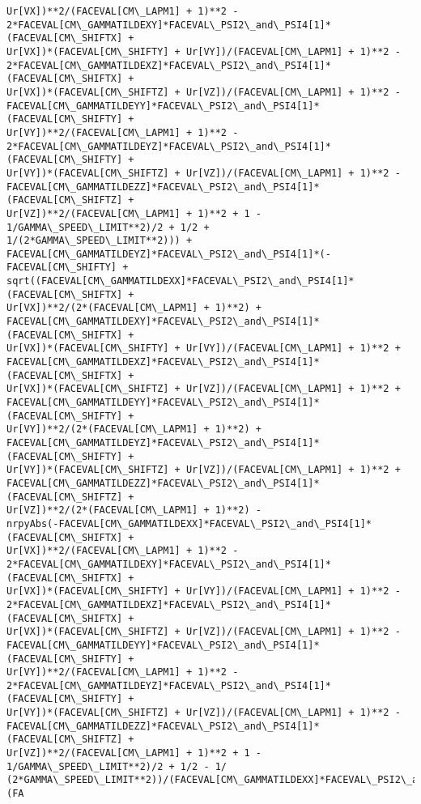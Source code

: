 \documentclass[landscape,letterpaper,10pt,english]{article}
\begin{document}
\begin{Verbatim}[commandchars=\\\{\}]
Ur[VX])**2/(FACEVAL[CM\_LAPM1] + 1)**2 -
2*FACEVAL[CM\_GAMMATILDEXY]*FACEVAL\_PSI2\_and\_PSI4[1]*(FACEVAL[CM\_SHIFTX] +
Ur[VX])*(FACEVAL[CM\_SHIFTY] + Ur[VY])/(FACEVAL[CM\_LAPM1] + 1)**2 -
2*FACEVAL[CM\_GAMMATILDEXZ]*FACEVAL\_PSI2\_and\_PSI4[1]*(FACEVAL[CM\_SHIFTX] +
Ur[VX])*(FACEVAL[CM\_SHIFTZ] + Ur[VZ])/(FACEVAL[CM\_LAPM1] + 1)**2 -
FACEVAL[CM\_GAMMATILDEYY]*FACEVAL\_PSI2\_and\_PSI4[1]*(FACEVAL[CM\_SHIFTY] +
Ur[VY])**2/(FACEVAL[CM\_LAPM1] + 1)**2 -
2*FACEVAL[CM\_GAMMATILDEYZ]*FACEVAL\_PSI2\_and\_PSI4[1]*(FACEVAL[CM\_SHIFTY] +
Ur[VY])*(FACEVAL[CM\_SHIFTZ] + Ur[VZ])/(FACEVAL[CM\_LAPM1] + 1)**2 -
FACEVAL[CM\_GAMMATILDEZZ]*FACEVAL\_PSI2\_and\_PSI4[1]*(FACEVAL[CM\_SHIFTZ] +
Ur[VZ])**2/(FACEVAL[CM\_LAPM1] + 1)**2 + 1 - 1/GAMMA\_SPEED\_LIMIT**2)/2 + 1/2 +
1/(2*GAMMA\_SPEED\_LIMIT**2))) +
FACEVAL[CM\_GAMMATILDEYZ]*FACEVAL\_PSI2\_and\_PSI4[1]*(-FACEVAL[CM\_SHIFTY] +
sqrt((FACEVAL[CM\_GAMMATILDEXX]*FACEVAL\_PSI2\_and\_PSI4[1]*(FACEVAL[CM\_SHIFTX] +
Ur[VX])**2/(2*(FACEVAL[CM\_LAPM1] + 1)**2) +
FACEVAL[CM\_GAMMATILDEXY]*FACEVAL\_PSI2\_and\_PSI4[1]*(FACEVAL[CM\_SHIFTX] +
Ur[VX])*(FACEVAL[CM\_SHIFTY] + Ur[VY])/(FACEVAL[CM\_LAPM1] + 1)**2 +
FACEVAL[CM\_GAMMATILDEXZ]*FACEVAL\_PSI2\_and\_PSI4[1]*(FACEVAL[CM\_SHIFTX] +
Ur[VX])*(FACEVAL[CM\_SHIFTZ] + Ur[VZ])/(FACEVAL[CM\_LAPM1] + 1)**2 +
FACEVAL[CM\_GAMMATILDEYY]*FACEVAL\_PSI2\_and\_PSI4[1]*(FACEVAL[CM\_SHIFTY] +
Ur[VY])**2/(2*(FACEVAL[CM\_LAPM1] + 1)**2) +
FACEVAL[CM\_GAMMATILDEYZ]*FACEVAL\_PSI2\_and\_PSI4[1]*(FACEVAL[CM\_SHIFTY] +
Ur[VY])*(FACEVAL[CM\_SHIFTZ] + Ur[VZ])/(FACEVAL[CM\_LAPM1] + 1)**2 +
FACEVAL[CM\_GAMMATILDEZZ]*FACEVAL\_PSI2\_and\_PSI4[1]*(FACEVAL[CM\_SHIFTZ] +
Ur[VZ])**2/(2*(FACEVAL[CM\_LAPM1] + 1)**2) -
nrpyAbs(-FACEVAL[CM\_GAMMATILDEXX]*FACEVAL\_PSI2\_and\_PSI4[1]*(FACEVAL[CM\_SHIFTX] +
Ur[VX])**2/(FACEVAL[CM\_LAPM1] + 1)**2 -
2*FACEVAL[CM\_GAMMATILDEXY]*FACEVAL\_PSI2\_and\_PSI4[1]*(FACEVAL[CM\_SHIFTX] +
Ur[VX])*(FACEVAL[CM\_SHIFTY] + Ur[VY])/(FACEVAL[CM\_LAPM1] + 1)**2 -
2*FACEVAL[CM\_GAMMATILDEXZ]*FACEVAL\_PSI2\_and\_PSI4[1]*(FACEVAL[CM\_SHIFTX] +
Ur[VX])*(FACEVAL[CM\_SHIFTZ] + Ur[VZ])/(FACEVAL[CM\_LAPM1] + 1)**2 -
FACEVAL[CM\_GAMMATILDEYY]*FACEVAL\_PSI2\_and\_PSI4[1]*(FACEVAL[CM\_SHIFTY] +
Ur[VY])**2/(FACEVAL[CM\_LAPM1] + 1)**2 -
2*FACEVAL[CM\_GAMMATILDEYZ]*FACEVAL\_PSI2\_and\_PSI4[1]*(FACEVAL[CM\_SHIFTY] +
Ur[VY])*(FACEVAL[CM\_SHIFTZ] + Ur[VZ])/(FACEVAL[CM\_LAPM1] + 1)**2 -
FACEVAL[CM\_GAMMATILDEZZ]*FACEVAL\_PSI2\_and\_PSI4[1]*(FACEVAL[CM\_SHIFTZ] +
Ur[VZ])**2/(FACEVAL[CM\_LAPM1] + 1)**2 + 1 - 1/GAMMA\_SPEED\_LIMIT**2)/2 + 1/2 - 1/
(2*GAMMA\_SPEED\_LIMIT**2))/(FACEVAL[CM\_GAMMATILDEXX]*FACEVAL\_PSI2\_and\_PSI4[1]*(FA

\end{Verbatim}
\end{document}

